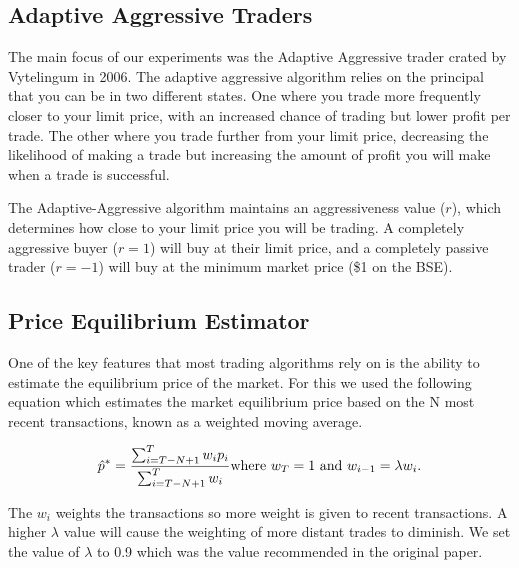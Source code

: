 \documentclass[preprint]{acm_proc_article-sp} %
\begin{document}
\subsection{Adaptive Aggressive Traders} \label{sec:AA}
The main focus of our experiments was the Adaptive Aggressive trader crated by
Vytelingum in 2006\cite{AA_thesis}. The adaptive aggressive algorithm relies on the principal that you can be in
two different states. One where you trade more frequently closer to your limit
price, with an increased chance of trading but lower profit per trade. The other where you
trade further from your limit price, decreasing the likelihood of making a
trade but increasing the amount of profit you will make when a trade is
successful.

The Adaptive-Aggressive algorithm maintains an aggressiveness value ($r$), which
determines how close to your limit price you will be trading. A completely
aggressive buyer ($r = 1$) will buy at their limit price, and a completely
passive trader ($r = -1$) will buy at the minimum market price (\$1 on the BSE).\\


\subsection{Price Equilibrium Estimator}
One of the key features that most trading algorithms rely on is the ability to
estimate the equilibrium price of the market. For this we used the following
equation which estimates the market equilibrium price based on the N most
recent transactions, known as a weighted moving average.

\begin{equation}
    \label{eqn:equilibrium_estimator}
    \hat p^* = \frac{\sum^T_{i=T-N+1}w_ip_i}{\sum^T_{i=T-N+1}w_i}\\
    \text{where $w_T = 1$ and $w_{i-1} = \lambda w_i$.}
\end{equation}

The $w_i$ weights the transactions so more weight is given to recent
transactions. A higher $\lambda$ value will cause the weighting of more distant
trades to diminish. We set the value of $\lambda$ to 0.9 which was the value
recommended in the original paper\cite[p.~100]{AA_thesis}.
\end{document}

